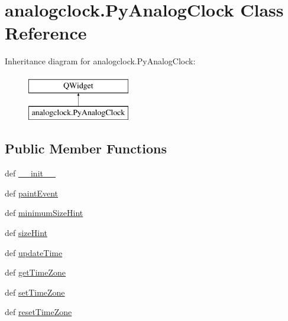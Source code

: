 \hypertarget{classanalogclock_1_1PyAnalogClock}{}\section{analogclock.\+Py\+Analog\+Clock Class Reference}
\label{classanalogclock_1_1PyAnalogClock}
Inheritance diagram for analogclock.\+Py\+Analog\+Clock\+:\begin{figure}[H]
\begin{center}
\leavevmode
\includegraphics[height=2.000000cm]{classanalogclock_1_1PyAnalogClock}
\end{center}
\end{figure}
\subsection*{Public Member Functions}
\begin{DoxyCompactItemize}
\item 
def \hyperlink{classanalogclock_1_1PyAnalogClock_aeec7bdaad7a3a7e23829bac25a391f21}{\+\_\+\+\_\+init\+\_\+\+\_\+}
\item 
def \hyperlink{classanalogclock_1_1PyAnalogClock_ad40745811c1fb48072605cbf1dc329ad}{paint\+Event}
\item 
def \hyperlink{classanalogclock_1_1PyAnalogClock_a3191851613c543aea4d249a680c7c807}{minimum\+Size\+Hint}
\item 
def \hyperlink{classanalogclock_1_1PyAnalogClock_a65a9f44a405755323ccce7092959ba51}{size\+Hint}
\item 
def \hyperlink{classanalogclock_1_1PyAnalogClock_aa38c2acbfe8456f17ece078c886b9d96}{update\+Time}
\item 
def \hyperlink{classanalogclock_1_1PyAnalogClock_a7e426d6c7d2785d41791f7411a24ae12}{get\+Time\+Zone}
\item 
def \hyperlink{classanalogclock_1_1PyAnalogClock_a37b3450fc051bf5a5b587b2e05529578}{set\+Time\+Zone}
\item 
def \hyperlink{classanalogclock_1_1PyAnalogClock_afcbe05f69db91985c44becce1aaf87a5}{reset\+Time\+Zone}
\end{DoxyCompactItemize}
